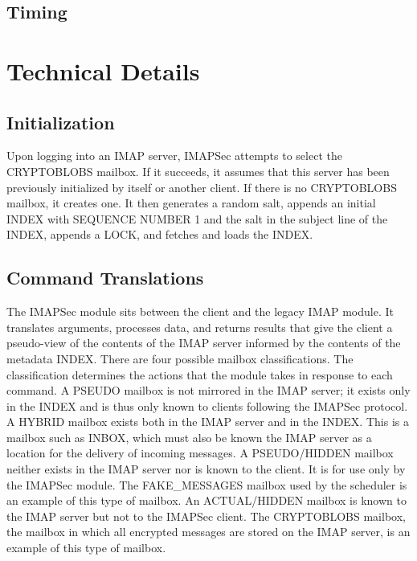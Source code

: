 \documentclass[pageno]{jpaper}
\newcommand{\project}{IMAPSec }
\begin{document}
\subsection{Timing}
  
\section{Technical Details}

\label{initialization}
\subsection{Initialization}
Upon logging into an IMAP server, \project attempts to select the CRYPTOBLOBS mailbox. If it succeeds, it assumes that this server has been previously initialized by itself or another client. If there is no CRYPTOBLOBS mailbox, it creates one. It then generates a random salt, appends an initial INDEX with SEQUENCE NUMBER 1 and the salt in the subject line of the INDEX, appends a LOCK, and fetches and loads the INDEX.

\subsection{Command Translations}
The \project module sits between the client and the legacy IMAP module. It translates arguments, processes data, and returns results that give the client a pseudo-view of the contents of the IMAP server informed by the contents of the metadata INDEX. There are four possible mailbox classifications. The classification determines the actions that the module takes in response to each command. A PSEUDO mailbox is not mirrored in the IMAP server; it exists only in the INDEX and is thus only known to clients following the \project protocol. A HYBRID mailbox exists both in the IMAP server and in the INDEX. This is a mailbox such as INBOX, which must also be known the IMAP server as a location for the delivery of incoming messages. A PSEUDO/HIDDEN mailbox neither exists in the IMAP server nor is known to the client. It is for use only by the \project module. The FAKE\_MESSAGES mailbox used by the scheduler is an example of this type of mailbox. An ACTUAL/HIDDEN mailbox is known to the IMAP server but not to the \project client. The CRYPTOBLOBS mailbox, the mailbox in which all encrypted messages are stored on the IMAP server, is an example of this type of mailbox. 

\label{select}
\end{document}
